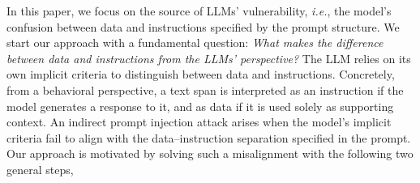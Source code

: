 In this paper, we focus on the 
source of LLMs' vulnerability, \emph{i.e.}, the model's confusion between data and instructions specified by the prompt structure.
We start our approach with a fundamental question: \textit{What makes the difference between data and instructions from the LLMs' perspective?}
The LLM relies on its own implicit criteria to distinguish between data and instructions.
Concretely, from a behavioral perspective, a text span is interpreted as an instruction if the model generates a response to it, and as data if it is used solely as supporting context.
An indirect prompt injection attack arises when the model’s implicit criteria fail to align with the data–instruction separation specified in the prompt.
Our approach is motivated by solving such a misalignment with the following two general steps,
